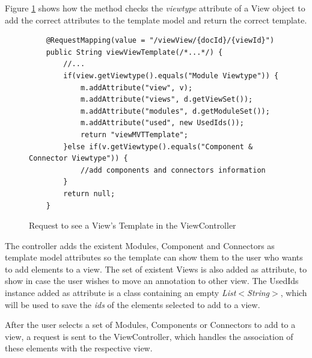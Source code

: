 \documentclass{llncs}
\begin{document}
Figure \ref{figure:ViewControllerViewTemplates} shows how the method checks the \textit{viewtype} attribute of a View object to add the correct attributes to the template model and return the correct template.
\begin{figure}
\lstset{style=customjava}
\begin{lstlisting}
	@RequestMapping(value = "/viewView/{docId}/{viewId}")
	public String viewViewTemplate(/*...*/) {
		//...
		if(view.getViewtype().equals("Module Viewtype")) {
			m.addAttribute("view", v);
			m.addAttribute("views", d.getViewSet());
			m.addAttribute("modules", d.getModuleSet());
			m.addAttribute("used", new UsedIds());
			return "viewMVTTemplate";
		}else if(v.getViewtype().equals("Component & Connector Viewtype")) {
			//add components and connectors information
		}
		return null;
	}	
\end{lstlisting}
\caption{Request to see a View's Template in the ViewController}
\label{figure:ViewControllerViewTemplates}
\end{figure}
The controller adds the existent Modules, Component and Connectors as template model attributes so the template can show them to the user who wants to add elements to a view. The set of existent Views is also added as attribute, to show in case the user wishes to move an annotation to other view. The UsedIds instance added as attribute is a class containing an empty \textit{List$<$String$>$}, which will be used to save the \textit{ids} of the elements selected to add to a view. 
 
After the user selects a set of Modules, Components or Connectors to add to a view, a request is sent to the ViewController, which handles the association of these elements with the respective view.
\end{document}
